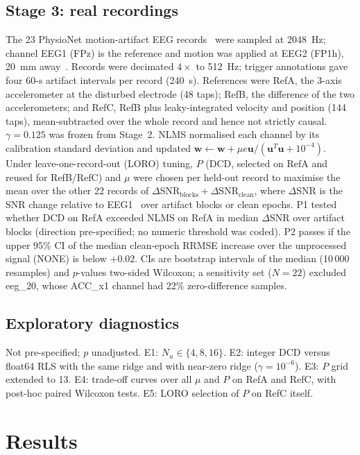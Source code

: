 \documentclass[conference]{IEEEtran}
\begin{document}
\subsection{Stage 3: real recordings}
The 23 PhysioNet motion-artifact EEG records~\cite{sweeney2014,goldberger2000} were sampled at 2048~Hz; channel EEG1 (FPz) is the reference and motion was applied at EEG2 (FP1h), 20~mm away~\cite{sweeney2012}. Records were decimated $4\times$ to 512~Hz; trigger annotations gave four 60-s artifact intervals per record (240~s). References were RefA, the 3-axis accelerometer at the disturbed electrode (48 taps); RefB, the difference of the two accelerometers; and RefC, RefB plus leaky-integrated velocity and position (144 taps), mean-subtracted over the whole record and hence not strictly causal. $\gamma = 0.125$ was frozen from Stage~2. NLMS normalised each channel by its calibration standard deviation and updated $\mathbf{w} \leftarrow \mathbf{w} + \mu e\mathbf{u}/(\mathbf{u}^T\mathbf{u} + 10^{-4})$. Under leave-one-record-out (LORO) tuning, $P$ (DCD, selected on RefA and reused for RefB/RefC) and $\mu$ were chosen per held-out record to maximise the mean over the other 22 records of $\Delta$SNR$_\mathrm{blocks} + \Delta$SNR$_\mathrm{clean}$, where $\Delta$SNR is the SNR change relative to EEG1~\cite{sweeney2012} over artifact blocks or clean epochs. P1 tested whether DCD on RefA exceeded NLMS on RefA in median $\Delta$SNR over artifact blocks (direction pre-specified; no numeric threshold was coded). P2 passes if the upper 95\% CI of the median clean-epoch RRMSE increase over the unprocessed signal (NONE) is below $+0.02$. CIs are bootstrap intervals of the median (10\,000 resamples) and $p$-values two-sided Wilcoxon; a sensitivity set ($N = 22$) excluded eeg\_20, whose ACC\_x1 channel had 22\% zero-difference samples.

\subsection{Exploratory diagnostics}
Not pre-specified; $p$ unadjusted. E1: $N_u \in \{4, 8, 16\}$. E2: integer DCD versus float64 RLS with the same ridge and with near-zero ridge ($\gamma = 10^{-6}$). E3: $P$ grid extended to 13. E4: trade-off curves over all $\mu$ and $P$ on RefA and RefC, with post-hoc paired Wilcoxon tests. E5: LORO selection of $P$ on RefC itself.

\section{Results}
\end{document}
